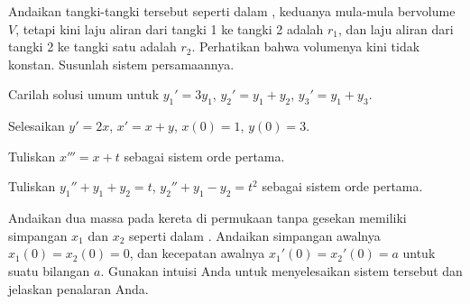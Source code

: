 \begin{exercise}
Andaikan tangki-tangki tersebut seperti dalam
, keduanya mula-mula bervolume $V$,
tetapi kini laju aliran dari tangki 1 ke tangki 2 adalah $r_1$, dan
laju aliran dari tangki 2 ke tangki satu adalah $r_2$.
Perhatikan bahwa volumenya kini tidak konstan.  Susunlah sistem persamaannya.
\end{exercise}

\setcounter{exercise}{100}

\begin{exercise}
Carilah solusi umum untuk $y_1' = 3 y_1$, $y_2' = y_1 + y_2$,
$y_3' = y_1 + y_3$.
\end{exercise}

\begin{exercise}
Selesaikan $y'=2x$, $x'=x+y$, $x(0)=1$, $y(0)=3$.
\end{exercise}

\begin{exercise}
Tuliskan $x''' = x+t$ sebagai sistem orde pertama.
\end{exercise}

\begin{exercise}
Tuliskan $y_1'' + y_1 + y_2 = t$,
$y_2'' + y_1 - y_2 = t^2$ sebagai sistem orde pertama.
\end{exercise}

\begin{exercise}
Andaikan dua massa pada kereta di permukaan tanpa gesekan memiliki
simpangan $x_1$ dan $x_2$ seperti dalam .
Andaikan simpangan awalnya $x_1(0)=x_2(0)=0$, dan kecepatan awalnya $x_1'(0) = x_2'(0) = a$ untuk suatu bilangan $a$.
Gunakan intuisi Anda
untuk menyelesaikan sistem tersebut dan jelaskan penalaran Anda.
\end{exercise}

